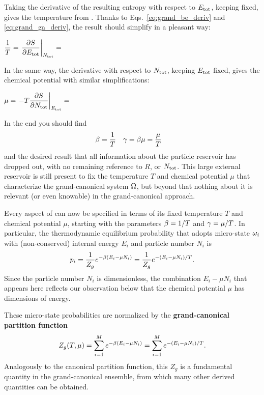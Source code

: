 Taking the derivative of the resulting entropy with respect to $E_{\text{tot}}$, keeping \Ntot fixed, gives the temperature from .
Thanks to Eqs.~\ref{eq:grand_be_deriv} and \ref{eq:grand_ga_deriv}, the result should simplify in a pleasant way:
\begin{mdframed}
  $\displaystyle \frac{1}{T} = \left. \frac{\partial S}{\partial E_{\text{tot}}}\right|_{N_{\text{tot}}} = $ \\[100 pt]
\end{mdframed}
In the same way, the derivative with respect to $N_{\text{tot}}$, keeping $E_{\text{tot}}$ fixed, gives the chemical potential with similar simplifications:
\begin{mdframed}
  $\displaystyle \mu = \left. -T \frac{\partial S}{\partial N_{\text{tot}}}\right|_{E_{\text{tot}}} = $ \\[100 pt]
\end{mdframed}
In the end you should find
\begin{align}
  \beta & = \frac{1}{T} &
  \gamma & = \beta \mu = \frac{\mu}{T}
\end{align}
and the desired result that all information about the particle reservoir has dropped out, with no remaining reference to $R$, \Etot or $N_{\text{tot}}$.
This large external reservoir is still present to fix the temperature $T$ and chemical potential $\mu$ that characterize the grand-canonical system $\Omega$, but beyond that nothing about it is relevant (or even knowable) in the grand-canonical approach.

Every aspect of \Om can now be specified in terms of its fixed temperature $T$ and chemical potential $\mu$, starting with the parameters $\beta = 1 / T$ and $\gamma = \mu / T$.
In particular, the thermodynamic equilibrium probability that \Om adopts micro-state $\omega_i$ with (non-conserved) internal energy $E_i$ and particle number $N_i$ is
\begin{equation}
  \label{eq:grand_prob}
  p_i = \frac{1}{Z_g} e^{-\beta (E_i - \mu N_i)} = \frac{1}{Z_g} e^{-(E_i - \mu N_i) / T}.
\end{equation}
Since the particle number $N_i$ is dimensionless, the combination $E_i - \mu N_i$ that appears here reflects our observation below  that the chemical potential $\mu$ has dimensions of energy.

\begin{shaded}
  These micro-state probabilities are normalized by the \textbf{grand-canonical partition function}
  \begin{equation}
    \label{eq:grand_part_func}
    Z_g(T, \mu) = \sum_{i = 1}^M e^{-\beta (E_i - \mu N_i)} = \sum_{i = 1}^M e^{-(E_i - \mu N_i) / T}.
  \end{equation}
  Analogously to the canonical partition function, this $Z_g$ is a fundamental quantity in the grand-canonical ensemble, from which many other derived quantities can be obtained.
\end{shaded}



